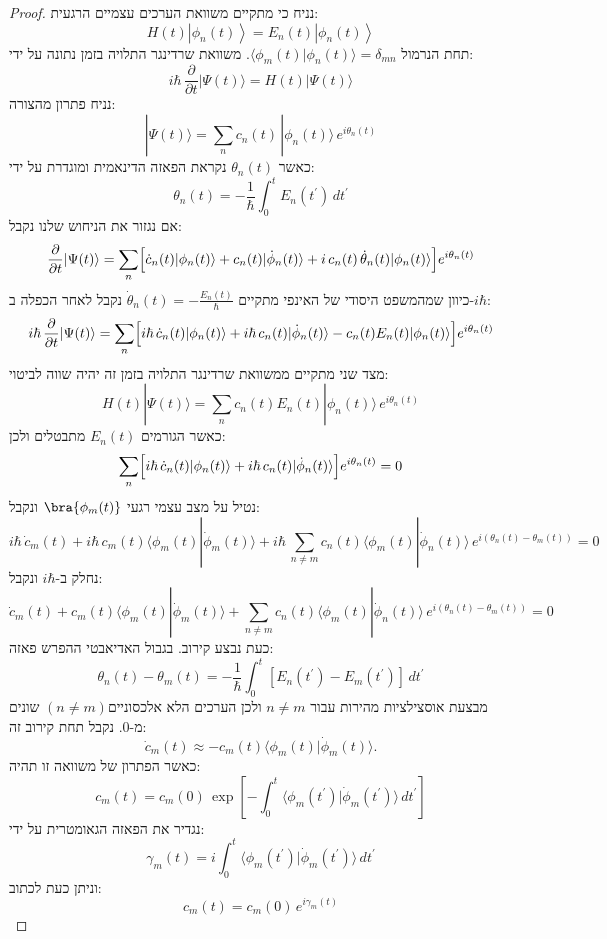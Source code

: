 \documentclass{tstextbook}
\begin{document}
\begin{proof}
נניח כי מתקיים משוואת הערכים עצמיים הרגעית:
$$H(t)\left|\phi_{n}(t)\right\rangle=E_{n}(t)\left|\phi_{n}(t)\right\rangle$$
תחת הנרמול \(\langle\phi_{m}(t)|\phi_{n}(t)\rangle=\delta_{m n}\). משוואת שרדינגר התלויה בזמן נתונה על ידי:
$$i\hbar\,\frac{\partial}{\partial t}|\Psi(t)\rangle=H(t)|\Psi(t)\rangle$$
נניח פתרון מהצורה:
$$|\Psi(t)\rangle=\sum_{n}c_{n}(t)\,|\phi_{n}(t)\rangle\,e^{i\theta_{n}(t)}$$
כאשר \(\theta_{n}(t)\) נקראת הפאזה הדינאמית ומוגדרת על ידי:
$$\theta_{n}(t)=-\frac{1}{\hbar}\int_{0}^{t}E_{n}(t^{\prime})\,d t^{\prime}$$
אם נגזור את הניחוש שלנו נקבל:
$$\frac{\partial}{\partial t}|\Psi(t)\rangle=\sum_{n}\Bigl[\dot{c}_{n}(t)|\phi_{n}(t)\rangle+c_{n}(t)|\dot{\phi}_{n}(t)\rangle+i\,c_{n}(t)\,\dot{\theta}_{n}(t)|\phi_{n}(t)\rangle\Bigr]e^{i\theta_{n}(t)}$$
כיוון שמהמשפט היסודי של האינפי מתקיים \(\dot{\theta}_{n}(t)=-\frac{E_{n}(t)}{\hbar}\) נקבל לאחר הכפלה ב-\(i\hbar\):
$$i\hbar\,\frac{\partial}{\partial t}|\Psi(t)\rangle=\sum_{n}\Bigl[i\hbar\,\dot{c}_{n}(t)|\phi_{n}(t)\rangle+i\hbar\,c_{n}(t)|\dot{\phi}_{n}(t)\rangle-c_{n}(t)E_{n}(t)|\phi_{n}(t)\rangle\Bigr]e^{i\theta_{n}(t)}$$
מצד שני מתקיים ממשוואת שרדינגר התלויה בזמן זה יהיה שווה לביטוי:
$$H(t)|\Psi(t)\rangle=\sum_{n}c_{n}(t)E_{n}(t)|\phi_{n}(t)\rangle\,e^{i\theta_{n}(t)}$$
כאשר הגורמים \(E_{n}(t)\) מתבטלים ולכן:
$$\sum_{n}\Bigl[i\hbar\,\dot{c}_{n}(t)|\phi_{n}(t)\rangle+i\hbar\,c_{n}(t)|\dot{\phi}_{n}(t)\rangle\Bigr]e^{i\theta_{n}(t)}=0$$
נטיל על מצב עצמי רגעי \(\bra{\phi_{m}(t)}\) ונקבל:
$$i\hbar\,\dot{c}_{m}(t)+i\hbar\,c_{m}(t)\langle\phi_{m}(t)|\dot{\phi}_{m}(t)\rangle+i\hbar\,\sum_{n\neq m}c_{n}(t)\langle\phi_{m}(t)|\dot{\phi}_{n}(t)\rangle\,e^{i(\theta_{n}(t)-\theta_{m}(t))}=0$$
נחלק ב-\(i\hbar\) ונקבל:
$$\dot{c}_{m}(t)+c_{m}(t)\langle\phi_{m}(t)|\dot{\phi}_{m}(t)\rangle+\sum_{n\neq m}c_{n}(t)\langle\phi_{m}(t)|\dot{\phi}_{n}(t)\rangle\,e^{i(\theta_{n}(t)-\theta_{m}(t))}=0$$
כעת נבצע קירוב. בגבול האדיאבטי ההפרש פאזה:
$$\theta_{n}(t)-\theta_{m}(t)=-\frac{1}{\hbar}\int_{0}^{t}[E_{n}(t^{\prime})-E_{m}(t^{\prime})]\,d t^{\prime}$$
מבצעת אוסצילציות מהירות עבור \(n\neq m\) ולכן הערכים הלא אלכסוניים\(\left( n\neq m \right)\) שונים מ-0. נקבל תחת קירוב זה:
$$\dot{c}_{m}(t)\approx-c_{m}(t)\langle\phi_{m}(t)|\dot{\phi}_{m}(t)\rangle.$$
כאשר הפתרון של משוואה זו תהיה:
$$c_{m}(t)=c_{m}(0)\,\exp\left[-\int_{0}^{t}\langle\phi_{m}(t^{\prime})|\dot{\phi}_{m}(t^{\prime})\rangle\,d t^{\prime}\right]$$
נגדיר את הפאזה הגאומטרית על ידי:
$$\gamma_{m}(t)=i\int_{0}^{t}\langle\phi_{m}(t^{\prime})|\dot{\phi}_{m}(t^{\prime})\rangle\,d t^{\prime}$$
וניתן כעת לכתוב:
$$c_{m}(t)=c_{m}(0)\,e^{i\gamma_{m}(t)}$$

\end{proof}
\end{document}
